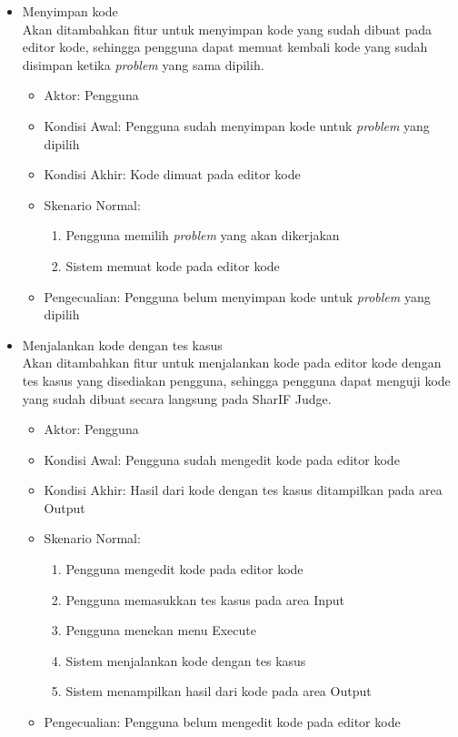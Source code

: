 \begin{itemize}
    \item Menyimpan kode \\ Akan ditambahkan fitur untuk menyimpan kode yang sudah dibuat pada editor kode, sehingga pengguna dapat memuat kembali kode yang sudah disimpan ketika \textit{problem} yang sama dipilih.
        \begin{itemize}
            \item Aktor: Pengguna
            \item Kondisi Awal: Pengguna sudah menyimpan kode untuk \textit{problem} yang dipilih
            \item Kondisi Akhir: Kode dimuat pada editor kode
            \item Skenario Normal:
                \begin{enumerate}
                    \item Pengguna memilih \textit{problem} yang akan dikerjakan
                    \item Sistem memuat kode pada editor kode
                \end{enumerate}
            \item Pengecualian: Pengguna belum menyimpan kode untuk \textit{problem} yang dipilih
        \end{itemize}
    
    
    \item Menjalankan kode dengan tes kasus \\  Akan ditambahkan fitur untuk menjalankan kode pada editor kode dengan tes kasus yang disediakan pengguna, sehingga pengguna dapat menguji kode yang sudah dibuat secara langsung pada SharIF Judge.
        \begin{itemize}
            \item Aktor: Pengguna
            \item Kondisi Awal: Pengguna sudah mengedit kode pada editor kode
            \item Kondisi Akhir: Hasil dari kode dengan tes kasus ditampilkan pada area Output
            \item Skenario Normal:
                \begin{enumerate}
                    \item Pengguna mengedit kode pada editor kode
                    \item Pengguna memasukkan tes kasus pada area Input
                    \item Pengguna menekan menu Execute
                    \item Sistem menjalankan kode dengan tes kasus
                    \item Sistem menampilkan hasil dari kode pada area Output
                \end{enumerate}
            \item Pengecualian:  Pengguna belum mengedit kode pada editor kode
        \end{itemize}
    

\end{itemize}
